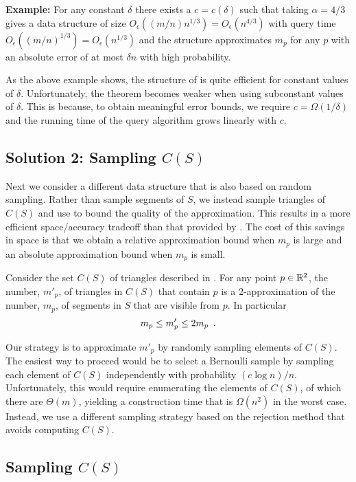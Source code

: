 \documentclass{patmorin}
\newcommand{\Oe}{O_\epsilon}
\begin{document}
\noindent\textbf{Example:} For any constant $\delta$ there exists
a $c=c(\delta)$ such that taking $\alpha = 4/3$ gives a data
structure of size $\Oe((m/n)n^{1/3})=\Oe(n^{4/3})$ with query time
$\Oe((m/n)^{1/3})=\Oe(n^{1/3})$ and the structure approximates $m_p$
for any $p$ with an absolute error of at most $\delta n$ with high
probability.

As the above example shows, the structure of  is quite
efficient for constant values of $\delta$. Unfortunately, the theorem
becomes weaker when using subconstant values of $\delta$.
This is because, to obtain meaningful error bounds, we require 
$c=\Omega(1/\delta)$ and the running time of the query algorithm grows
linearly with $c$.

\subsection{Solution 2: Sampling $C(S)$}

Next we consider a different data structure that is also based on
random sampling. Rather than sample segments of $S$, we instead sample
triangles of $C(S)$ and use  to bound the quality of the
approximation.  This results in a more efficient space/accuracy tradeoff
than that provided by .  The cost of this savings
in space is that we obtain a relative approximation bound when $m_p$
is large and an absolute approximation bound when $m_p$ is small.

Consider the set $C(S)$ of triangles described in .
For any point $p\in\mathbb{R}^2$, the number, $m'_p$, of triangles in $C(S)$ that
contain $p$ is a 2-approximation of the number, $m_p$,  of segments in $S$
that are visible from $p$.  In particular
\begin{equation}
   m_p \le m'_p \le 2m_p \enspace . \eqlabel{mpmp}
\end{equation}

Our strategy is to approximate $m'_p$ by randomly sampling elements of
$C(S)$.  The easiest way to proceed would be to select a Bernoulli sample
by sampling each element of $C(S)$ independently with probability $(c\log
n)/n$.  Unfortunately, this would require enumerating the elements of
$C(S)$, of which there are $\Theta(m)$, yielding a construction time that
is $\Omega(n^2)$ in the worst case.  Instead, we use a different sampling
strategy based on the rejection method that avoids computing $C(S)$.

\subsection{Sampling $C(S)$}
\end{document}
